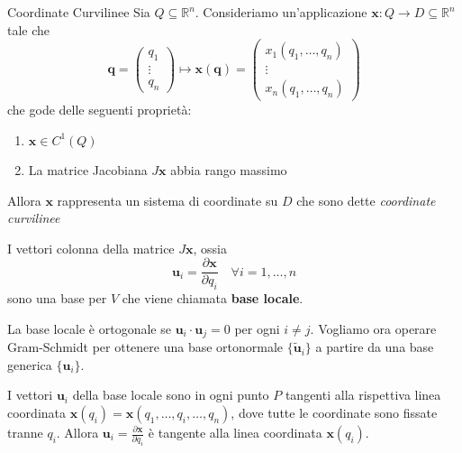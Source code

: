 \begin{definition}{Coordinate Curvilinee}
Sia \(Q \subseteq \mathbb{R}^{n} \). Consideriamo un'applicazione \(\mathbf{x} :
Q \to D \subseteq \mathbb{R}^{n} \) tale che 
\[
  \mathbf{q} = \begin{pmatrix}
      q_{1} \\
      \vdots  \\
      q_n
  \end{pmatrix} \mapsto \mathbf{x} {(\mathbf{q} )} = \begin{pmatrix}
      x_{1}{(q_{1}, \dots, q_{n})} \\
      \vdots \\
      x_{n}{(q_{1}, \dots, q_{n})}
  \end{pmatrix}
\]
che gode delle seguenti proprietà:
\begin{enumerate}[label = \arabic*.]
    \item \(\mathbf{x}  \in C^{1}{(Q)}\) 
    \item La matrice Jacobiana \(J\mathbf{x} \) abbia rango massimo
\end{enumerate}
Allora \(\mathbf{x} \) rappresenta un sistema di coordinate su \(D\) che sono
dette \emph{coordinate curvilinee}
\end{definition}
I vettori colonna della matrice \(J\mathbf{x} \), ossia
\[
  \mathbf{u}_i = \frac{\partial \mathbf{x} }{\partial q_{i}} \quad \forall i =
  1, \dots, n
\]
sono una base per \(V\) che viene chiamata \textbf{base locale}.

La base locale è ortogonale se \(\mathbf{u}_i \cdot \mathbf{u}_j = 0\) per ogni
\(i \neq j\). Vogliamo ora operare Gram-Schmidt per ottenere una base
ortonormale \(\{\tilde{\mathbf{u}}_i\} \) a partire da una base generica
\(\{\mathbf{u}_i\}\). 

\begin{remark}
    I vettori \(\mathbf{u}_i\) della base locale sono in ogni punto \(P\)
    tangenti alla rispettiva linea coordinata \(\mathbf{x} {(q_{i})} = \mathbf{x}(q_{1}, \dots, q_{i},
    \dots, q_{n})\), dove tutte le coordinate sono fissate tranne \(q_{i}\).
    Allora \(\mathbf{u}_i = \frac{\partial \mathbf{x} }{\partial q_{i}}\) è
    tangente alla linea coordinata \(\mathbf{x} {(q_{i})}\).
\end{remark}

